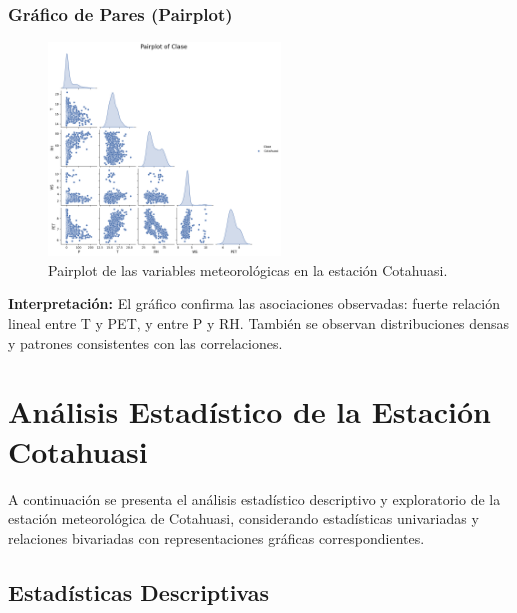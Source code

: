 \subsubsection*{Gráfico de Pares (Pairplot)}
\begin{figure}[H]
\centering
\includegraphics[width=0.55\textwidth]{resultados/por_estacion_meteorologica/Cotahuasi/pairplot.png}
\caption{Pairplot de las variables meteorológicas en la estación Cotahuasi.}
\label{fig:cotahuasi_pairplot}
\end{figure}
\textbf{Interpretación:} El gráfico confirma las asociaciones observadas: fuerte relación lineal entre T y PET, y entre P y RH. También se observan distribuciones densas y patrones consistentes con las correlaciones.




\section{Análisis Estadístico de la Estación Cotahuasi}

A continuación se presenta el análisis estadístico descriptivo y exploratorio de la estación meteorológica de Cotahuasi, considerando estadísticas univariadas y relaciones bivariadas con representaciones gráficas correspondientes.

\subsection{Estadísticas Descriptivas}

